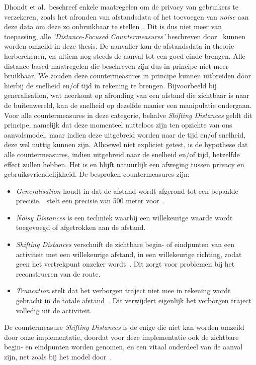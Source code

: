 Dhondt et al.\ beschreef enkele maatregelen om de privacy van gebruikers te
verzekeren, zoals het afronden van afstandsdata of het toevoegen van
\textit{noise} aan deze data om deze zo onbruikbaar te stellen~\cite{Dhondt}.
Dit is dus niet meer van toepassing, alle \textit{`Distance-Focused
    Countermeasures'} beschreven door~\citeauthor{Dhondt} kunnen worden omzeild in
deze thesis. De aanvaller kan de afstandsdata in theorie herberekenen, en
ultiem nog steeds de aanval tot een goed einde brengen. Alle distance based
maatregelen die \citeauthor{Dhondt} beschreven zijn dus in principe niet meer
bruikbaar. We zouden deze countermeasures in principe kunnen uitbreiden door
hierbij de snelheid en/of tijd in rekening te brengen. Bijvoorbeeld bij
generalisation, wat neerkomt op afronding van een afstand die zichtbaar is naar
de buitenwereld, kan de snelheid op dezelfde manier een manipulatie ondergaan.
Voor alle countermeasures in deze categorie, behalve \textit{Shifting
    Distances} geldt dit principe, namelijk dat deze momenteel nutteloos zijn ten
opzichte van ons aanvalsmodel, maar indien deze uitgebreid worden naar de tijd
en/of snelheid, deze wel nuttig kunnen zijn. Alhoewel niet expliciet getest, is
de hypothese dat alle countermeasures, indien uitgebreid naar de snelheid en/of
tijd, hetzelfde effect zullen hebben. Het is en blijft natuurlijk een afweging
tussen privacy en gebruiksvriendelijkheid. De besproken countermeasures zijn:
\begin{itemize}
    \item \textit{Generalisation} houdt in dat de afstand wordt afgerond tot een bepaalde
          precisie.~\citeauthor{Dhondt} stelt een precisie van 500 meter
          voor~\cite{Dhondt}.
    \item \textit{Noisy Distances} is een techniek waarbij een willekeurige waarde wordt
          toegevoegd of afgetrokken aan de afstand.
    \item \textit{Shifting Distances} verschuift de zichtbare begin- of eindpunten van een activiteit met een willekeurige afstand, in een willekeurige richting,
          zodat geen het vertrekpunt onzeker wordt~\cite{Dhondt}. Dit zorgt voor problemen bij het reconstrueren van de route.
    \item \textit{Truncation} stelt dat het verborgen traject niet mee in rekening wordt gebracht in de
          totale afstand~\cite{Dhondt}. Dit verwijdert eigenlijk het verborgen traject volledig uit de activiteit.
\end{itemize}
De countermeasure \textit{Shifting Distances} is de enige die niet kan worden
omzeild door onze implementatie, doordat voor deze implementatie ook de
zichtbare begin- en eindpunten worden genomen, en een vitaal onderdeel van de
aanval zijn, net zoals bij het model door~\citeauthor{Dhondt}.

